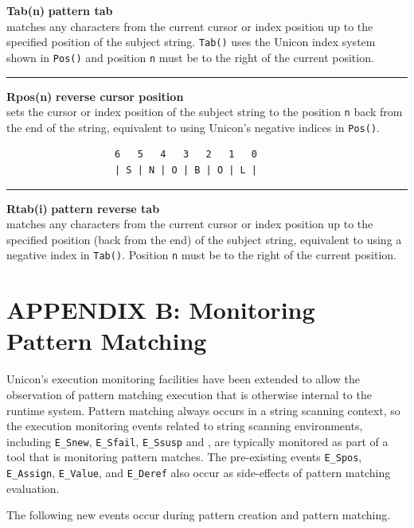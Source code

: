 \documentclass[letterpaper,12pt]{article}
\begin{document}
{\noindent\textbf{Tab(n)} \hfill\textbf{pattern tab}\\
matches any characters from the current cursor or index position up to
the specified position of the subject string.  \texttt{Tab()} uses the
Unicon index system shown in \texttt{Pos()} and position \texttt{n} must
be to the right of the current position.\\
\noindent\rule{16.5cm}{0.1pt}

\noindent\textbf{Rpos(n)} \hfill\textbf{reverse cursor position}\\
sets the cursor or index position of the subject string to the
position \texttt{n} back from the end of the string, equivalent to
using Unicon's negative indices in \texttt{Pos()}.
\begin{verbatim}
                   6   5   4   3   2   1   0
                   | S | N | O | B | O | L |
\end{verbatim}
\noindent\rule{16.5cm}{0.1pt}

\noindent\textbf{Rtab(i)} \hfill\textbf{pattern reverse tab}\\
matches any characters from the current cursor or index position up to
the specified position (back from the end) of the subject string,
equivalent to using a negative index in \texttt{Tab()}.
Position \texttt{n} must be to the right of the current position.\\

\section*{APPENDIX B: Monitoring Pattern Matching}

Unicon's execution monitoring facilities have been extended to allow
the observation of pattern matching execution that is otherwise
internal to the runtime system.  Pattern matching always occurs in a
string scanning context, so the execution monitoring events related
to string scanning environments, including \texttt{E\_Snew},
\texttt{E\_Sfail}, \texttt{E\_Ssusp} and , are
typically monitored as part of a tool that is monitoring pattern matches.
The pre-existing events \texttt{E\_Spos}, \texttt{E\_Assign},
\texttt{E\_Value}, and \texttt{E\_Deref} also occur as side-effects
of pattern matching evaluation.

The following new events occur during pattern creation and pattern
matching.

\vspace{0.1in}

}
\end{document}
